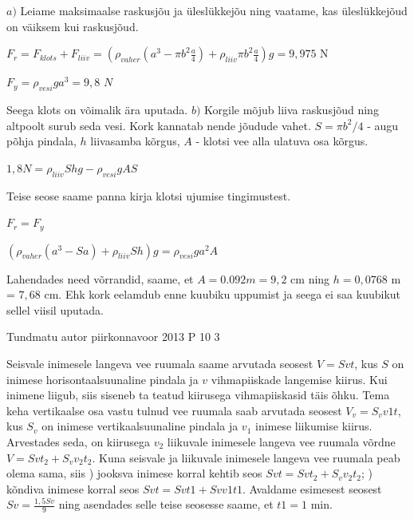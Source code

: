 \documentclass[11pt]{article}
\begin{document}
{{\ifSolution
$a)$ Leiame maksimaalse raskusjõu ja üleslükkejõu ning vaatame, kas üleslükkejõud on väiksem kui raskusjõud.
\begin{center}
$F_r = F_{klots} + F_{liiv} = (\rho_{vaher}(a^3 - \pi b^2 \frac{a}{4}) + \rho_{liiv} \pi b^2 \frac{a}{4})g = 9,975$ N
\end{center}
\begin{center}
$F_y = \rho_{vesi} ga^3 = 9,8$ $N$
\end{center}
Seega klots on võimalik ära uputada.
\newline
$b)$ Korgile mõjub liiva raskusjõud ning altpoolt surub seda vesi. Kork kannatab nende jõudude vahet. $S = \pi b^2/4$ - augu põhja pindala, $h$ liivasamba kõrgus, $A$ - klotsi vee alla ulatuva osa kõrgus.
\begin{center}
$1, 8 N = \rho_{liiv}Shg - \rho_{vesi}g AS$
\end{center}
Teise seose saame panna kirja klotsi ujumise tingimustest.
\begin{center}
$F_r = F_y$
\end{center}
\begin{center}
$(\rho_{vaher}(a^3 - Sa) + \rho_{liiv} Sh)g = \rho_{vesi}ga^2 A$
\end{center}
Lahendades need võrrandid, saame, et $A = 0.092m = 9,2$ cm ning $h = 0,0768$ m = $7,68$ cm. Ehk kork eelamdub enne kuubiku uppumist ja seega ei saa kuubikut sellel viisil uputada.
\fi
}

{Tundmatu autor} %
{piirkonnavoor} %
{2013} %
{P 10} %
{3} %
{

\ifSolution
Seisvale inimesele langeva vee ruumala saame arvutada seosest $V = Svt$, kus $S$ on inimese horisontaalsuunaline pindala ja $v$ vihmapiiskade langemise kiirus. 
\newline
Kui inimene liigub, siis siseneb ta teatud kiirusega vihmapiiskasid täis õhku. Tema keha vertikaalse osa vastu tulnud vee ruumala saab arvutada seosest $V_v = S_v v 1t$, kus $S_v$ on inimese vertikaalsuunaline pindala ja $v_1$ inimese liikumise kiirus. 
\newline
Arvestades seda, on kiirusega $v_2$ liikuvale inimesele langeva vee ruumala võrdne $V = Svt_2 + S_v v_2 t_2$. 
\newline
Kuna seisvale ja liikuvale inimesele langeva vee ruumala peab olema sama, siis 
) jooksva inimese korral kehtib seos $Svt = Svt_2 + S_v v_2 t_2$; 
) kõndiva inimese korral seos $Svt = Svt1 + Svv1t1$. 
\newline
Avaldame esimesest seosest $Sv = \frac {1,5Sv}{9} $ ning asendades selle teise seosesse saame, et $t1 = 1$ min.
\fi
}

}
\end{document}
